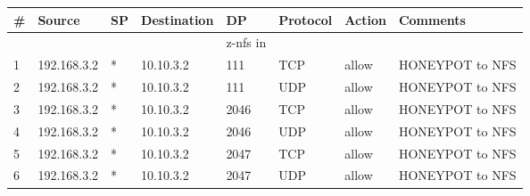 \documentclass[a4paper, 11pt, oneside]{article}
\begin{document}
\begin{table}[H]
\begin{tabular}{|llllllll|}
  \hline
  \multicolumn{1}{|l|}{\textbf{\#}} & \multicolumn{1}{l|}{\textbf{Source}} & \multicolumn{1}{l|}{\textbf{SP}} & \multicolumn{1}{l|}{\textbf{Destination}} & \multicolumn{1}{l|}{\textbf{DP}} & \multicolumn{1}{l|}{\textbf{Protocol}} & \multicolumn{1}{l|}{\textbf{Action}} & \textbf{Comments}   \\ \hline
                                    &                                      &                                  &                                           & {\color[HTML]{FE0000} z-nfs in}  &                                        &                                      &                     \\ \hline
  \multicolumn{1}{|l|}{1}           & \multicolumn{1}{l|}{192.168.3.2}     & \multicolumn{1}{l|}{*}           & \multicolumn{1}{l|}{10.10.3.2}            & \multicolumn{1}{l|}{111}         & \multicolumn{1}{l|}{TCP}               & \multicolumn{1}{l|}{allow}           & HONEYPOT to NFS     \\ \hline
  \multicolumn{1}{|l|}{2}           & \multicolumn{1}{l|}{192.168.3.2}     & \multicolumn{1}{l|}{*}           & \multicolumn{1}{l|}{10.10.3.2}            & \multicolumn{1}{l|}{111}         & \multicolumn{1}{l|}{UDP}               & \multicolumn{1}{l|}{allow}           & HONEYPOT to NFS     \\ \hline
  \multicolumn{1}{|l|}{3}          & \multicolumn{1}{l|}{192.168.3.2}     & \multicolumn{1}{l|}{*}           & \multicolumn{1}{l|}{10.10.3.2}            & \multicolumn{1}{l|}{2046}        & \multicolumn{1}{l|}{TCP}               & \multicolumn{1}{l|}{allow}           & HONEYPOT to NFS     \\ \hline
  \multicolumn{1}{|l|}{4}          & \multicolumn{1}{l|}{192.168.3.2}     & \multicolumn{1}{l|}{*}           & \multicolumn{1}{l|}{10.10.3.2}            & \multicolumn{1}{l|}{2046}        & \multicolumn{1}{l|}{UDP}               & \multicolumn{1}{l|}{allow}           & HONEYPOT to NFS     \\ \hline
  \multicolumn{1}{|l|}{5}          & \multicolumn{1}{l|}{192.168.3.2}     & \multicolumn{1}{l|}{*}           & \multicolumn{1}{l|}{10.10.3.2}            & \multicolumn{1}{l|}{2047}        & \multicolumn{1}{l|}{TCP}               & \multicolumn{1}{l|}{allow}           & HONEYPOT to NFS     \\ \hline
  \multicolumn{1}{|l|}{6}          & \multicolumn{1}{l|}{192.168.3.2}     & \multicolumn{1}{l|}{*}           & \multicolumn{1}{l|}{10.10.3.2}            & \multicolumn{1}{l|}{2047}        & \multicolumn{1}{l|}{UDP}               & \multicolumn{1}{l|}{allow}           & HONEYPOT to NFS     \\ \hline

\end{tabular}
\end{table}
\end{document}
